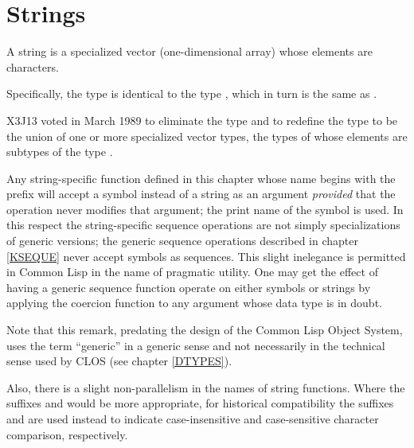 

\chapter{Strings}
\def\pagestatus{FINAL PROOF}

A string is a specialized vector (one-dimensional array)
whose elements are characters.

\begin{obsolete}
Specifically, the type 
is identical to the type , which in turn
is the same as .
\end{obsolete}

\begin{newer}
X3J13 voted in March 1989 
to eliminate the type  and to redefine the type
 to be the union of one or more specialized vector
types, the types of whose elements are subtypes of the type .
\end{newer}

Any string-specific function defined in this chapter
whose name begins with the prefix 
will accept a symbol instead of a string
as an argument {\it provided} that the operation never modifies that argument;
the print name of the symbol is used.
In this respect the string-specific sequence operations are not
simply specializations of generic versions; the generic sequence
operations described in chapter \ref{KSEQUE} never accept symbols as sequences.
This slight inelegance is permitted in Common Lisp in the name of pragmatic utility.
One may get the effect of having a generic sequence function
operate on either symbols or strings by applying the coercion
function  to any argument whose data type is in doubt.
\begin{new}
Note that this remark, predating the design of the Common Lisp Object System,
uses the term ``generic'' in a generic sense and not necessarily
in the technical sense used by CLOS
(see chapter \ref{DTYPES}).
\end{new}

Also, there is a slight non-parallelism in the names of string functions.
Where the suffixes  and  would be more appropriate,
for historical compatibility the suffixes  and \cd{=} are used instead
to indicate case-insensitive and case-sensitive character comparison,
respectively.

